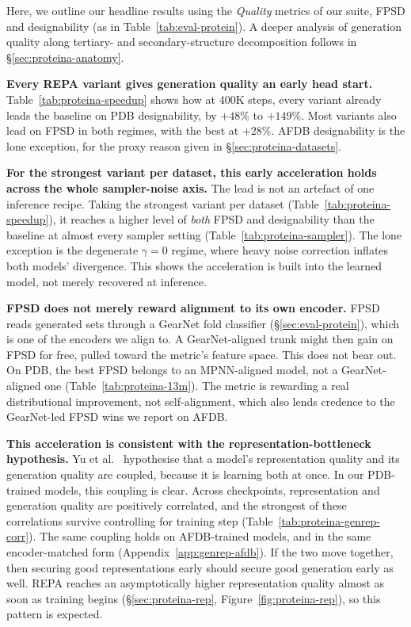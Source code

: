 \documentclass[12pt,a4paper,twoside]{report}
\begin{document}
Here, we outline our headline results using the \emph{Quality} metrics of our suite, FPSD and designability (as in Table~\ref{tab:eval-protein}). A deeper analysis of generation quality along tertiary- and secondary-structure decomposition follows in \S\ref{sec:proteina-anatomy}.

\textbf{Every REPA variant gives generation quality an early head start.} Table~\ref{tab:proteina-speedup} shows how at 400K steps, every variant already leads the baseline on PDB designability, by $+48\%$ to $+149\%$. Most variants also lead on FPSD in both regimes, with the best at $+28\%$. AFDB designability is the lone exception, for the proxy reason given in \S\ref{sec:proteina-datasets}.



\textbf{For the strongest variant per dataset, this early acceleration holds across the whole sampler-noise axis.} The lead is not an artefact of one inference recipe. Taking the strongest variant per dataset (Table~\ref{tab:proteina-speedup}), it reaches a higher level of \emph{both} FPSD and designability than the baseline at almost every sampler setting (Table~\ref{tab:proteina-sampler}). The lone exception is the degenerate $\gamma{=}0$ regime, where heavy noise correction inflates both models' divergence. This shows the acceleration is built into the learned model, not merely recovered at inference.



\textbf{FPSD does not merely reward alignment to its own encoder.} FPSD reads generated sets through a GearNet fold classifier (\S\ref{sec:eval-protein}), which is one of the encoders we align to. A GearNet-aligned trunk might then gain on FPSD for free, pulled toward the metric's feature space. This does not bear out. On PDB, the best FPSD belongs to an MPNN-aligned model, not a GearNet-aligned one (Table~\ref{tab:proteina-13m}). The metric is rewarding a real distributional improvement, not self-alignment, which also lends credence to the GearNet-led FPSD wins we report on AFDB.

\textbf{This acceleration is consistent with the representation-bottleneck hypothesis.} Yu et al.~\cite{REPA} hypothesise that a model's representation quality and its generation quality are coupled, because it is learning both at once. In our PDB-trained models, this coupling is clear. Across checkpoints, representation and generation quality are positively correlated, and the strongest of these correlations survive controlling for training step (Table~\ref{tab:proteina-genrep-corr}). The same coupling holds on AFDB-trained models, and in the same encoder-matched form (Appendix~\ref{app:genrep-afdb}). If the two move together, then securing good representations early should secure good generation early as well. REPA reaches an asymptotically higher representation quality almost as soon as training begins (\S\ref{sec:proteina-rep}, Figure~\ref{fig:proteina-rep}), so this pattern is expected.
\end{document}
